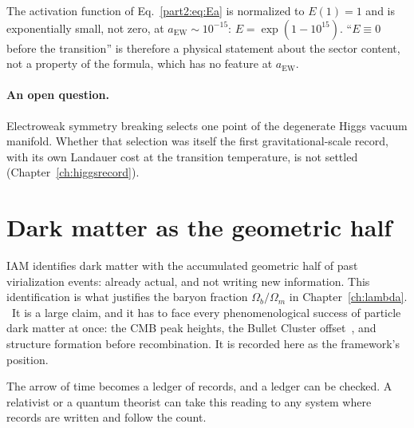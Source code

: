 \begin{remark}
The activation function of Eq.~\eqref{part2:eq:Ea} is normalized to $E(1)=1$ and is exponentially
small, not zero, at $a_{\mathrm{EW}}\sim10^{-15}$: $E=\exp(1-10^{15})$. ``$E\equiv0$ before
the transition'' is therefore a physical statement about the sector content, not a property
of the formula, which has no feature at $a_{\mathrm{EW}}$. \calc
\end{remark}

\paragraph{An open question.} Electroweak symmetry breaking selects one point of the degenerate Higgs vacuum manifold. Whether that selection was itself
the first gravitational-scale record, with its own Landauer cost at the transition temperature, is not settled (Chapter~\ref{ch:higgsrecord}). \openprob

\section{Dark matter as the geometric half}

IAM identifies dark matter with the accumulated geometric half of past
virialization events: already actual, and not writing new information. This identification
is what justifies the baryon fraction $\Omega_b/\Omega_m$ in Chapter~\ref{ch:lambda}.
\conjecture\ It is a large claim, and it has to face every phenomenological success of
particle dark matter at once: the CMB peak heights, the Bullet Cluster offset~\cite{Clowe2006}, and
structure formation before recombination. It is recorded here as the framework's position.

The arrow of time becomes a ledger of records, and a ledger can be checked. A relativist or a quantum theorist can take this reading to any system where records are written and follow the count.
